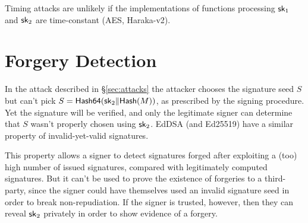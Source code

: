 Timing attacks are unlikely if the implementations of functions processing $\mathsf{sk}_1$ and $\mathsf{sk}_2$ are time-constant (AES, Haraka-v2).


\section{Forgery Detection}\label{sec:detection}

In the attack described in \S\ref{sec:attacks} the attacker chooses the signature seed $S$ but can't pick $S=\textsf{Hash64}(\mathsf{sk}_2 \Vert \textsf{Hash}(M))$, as prescribed by the signing procedure.
Yet the signature will be verified, and only the legitimate signer can determine that $S$ wasn't properly chosen using $\mathsf{sk}_2$.
EdDSA (and Ed25519) have a similar property of invalid-yet-valid signatures.

This property allows a signer to detect signatures forged after exploiting a (too) high number of issued signatures, compared with legitimately computed signatures.
But it can't be used to prove the existence of forgeries to a third-party, since the signer could have themselves used an invalid signature seed in order to break non-repudiation.
If the signer is trusted, however, then they can reveal $\mathsf{sk}_2$ privately in order to show evidence of a forgery.